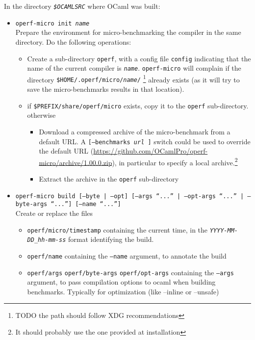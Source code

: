 \documentclass[11pt,a4paper]{article}
\begin{document}
In the directory {\tt\em \$OCAMLSRC} where OCaml was built:
\begin{itemize}
\item {\tt operf-micro init {\em name}}\\ Prepare the environment
  for micro-benchmarking the compiler in the same directory.
  Do the following operations:
  \begin{itemize}
  \item Create a sub-directory {\tt operf}, with a config file {\tt config}
  indicating that the name of the current compiler is {\tt\em name}.
  {\tt operf-micro} will complain if the directory
  {\tt \$HOME/.operf/micro/{\em name}/} \footnote{TODO the path should
    follow XDG recommendations} already exists (as it will try to
  save the micro-benchmarks results in that location).
  \item
    if {\tt \$PREFIX/share/operf/micro} exists, copy it to the
    {\tt operf} sub-directory.\\
    otherwise
    \begin{itemize}
    \item Download a compressed archive of the micro-benchmark from a
      default URL. A {\tt [--benchmarks {\em url} ]} switch could be
      used to override the default URL
      (\url{https://github.com/OCamlPro/operf-micro/archive/1.00.0.zip}),
      in particular to specify a local archive.\footnote{It should
        probably use the one provided at installation}
    \item Extract the archive in the {\tt operf} sub-directory
    \end{itemize}
  \end{itemize}
\item {\tt operf-micro build [--byte | --opt] [--args ``...'' | --opt-args ``...'' | --byte-args ``...''] [--name ``...'']}\\
  Create or replace the files
  \begin{itemize}
  \item {\tt operf/micro/timestamp} containing the current time, in the
    {\tt\em YYYY-MM-DD\_hh-mm-ss} format identifying the build.
  \item {\tt operf/name} containing the {\tt --name} argument, to
    annotate the build
  \item {\tt operf/args} {\tt operf/byte-args} {\tt operf/opt-args}
    containing the {\tt --args} argument, to pass compilation options
    to ocaml when building benchmarks. Typically for optimization
    (like --inline or --unsafe)

\end{itemize}
\end{itemize}
\end{document}

